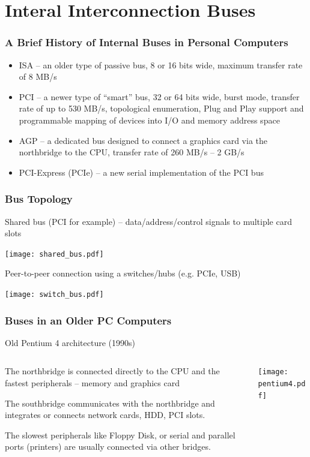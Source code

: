 \documentclass{beamer}
\begin{document}
\section{Interal Interconnection Buses}

\begin{frame}
\frametitle{A Brief History of Internal Buses in Personal Computers}

\begin{itemize}
\item ISA – an older type of passive bus, 8 or 16 bits wide, maximum transfer rate of 8 MB/s
\item PCI – a newer type of “smart” bus, 32 or 64 bits wide, burst mode, transfer rate of up to 530 MB/s, topological enumeration, Plug and Play support and programmable mapping of devices into I/O and memory address space
\item AGP – a dedicated bus designed to connect a graphics card via the northbridge to the CPU, transfer rate of 260 MB/s – 2 GB/s
\item PCI-Express (PCIe) -- a new serial implementation of the PCI bus
\end{itemize}
\end{frame}


\begin{frame}
\frametitle{Bus Topology}
Shared bus (PCI for example) -- data/address/control signals to multiple card slots
\begin{center}
\texttt{[image: shared\_bus.pdf]}
\end{center}

Peer-to-peer connection using a switches/hubs (e.g. PCIe, USB)
\begin{center}
\texttt{[image: switch\_bus.pdf]}
\end{center}
\end{frame}


\begin{frame}
\frametitle{Buses in an Older PC Computers}
\begin{center}
Old Pentium 4 architecture (1990s)
\end{center}

\begin{columns}
\begin{column}{0.5\textwidth}
The northbridge is connected directly to the CPU and the fastest peripherals -- memory and graphics card
\bigskip

The southbridge communicates with the northbridge and integrates or connects network cards, HDD, PCI slots.

\bigskip
The slowest peripherals like Floppy Disk, or serial and parallel ports (printers) are usually connected via other bridges.
\end{column}
\begin{column}{0.5\textwidth}
\texttt{[image: pentium4.pdf]}
\end{column}
\end{columns}
\end{frame}
\end{document}
